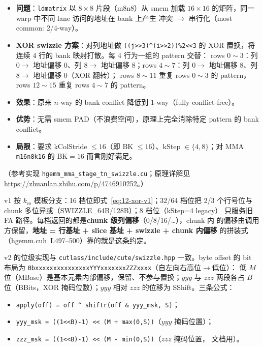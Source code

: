 \begin{itemize}
  \item \textbf{问题}：\texttt{ldmatrix} 以 $8\times8$ 片段（m8n8）从 smem 加载
        $16\times16$ 的矩阵，同一 warp 中不同 lane 访问的地址在 bank 上产生
        冲突 $\to$ 串行化（most common: 2/4-way）。
  \item \textbf{XOR swizzle 方案}：对列地址做 \texttt{((j>>3)\^{}(i>>2))\%2<<3} 的
        XOR 置换，将连续 4 行的 bank 映射打散。每 4 行为一组的 pattern 交替：
        rows $0{\sim}3$：列 $0\to$ 地址偏移 $0$、列 $8\to$ 地址偏移 $8$；rows
        $4{\sim}7$：列 $0\to$ 地址偏移 $8$、列 $8\to$ 地址偏移 $0$（XOR 翻转）；
        rows $8{\sim}11$ 重复 rows $0{\sim}3$ 的 pattern，rows $12{\sim}15$ 重复
        rows $4{\sim}7$ 的 pattern。
  \item \textbf{效果}：原来 $n$-way 的 bank conflict 降低到 1-way（fully
        conflict-free）。
  \item \textbf{优势}：无需 smem PAD（不浪费空间），原理上完全消除特定
        pattern 的 bank conflict。
  \item \textbf{局限}：要求 kColStride $\le 16$（即 BK $\le 16$）、kStep
        $\in \{4, 8\}$；对 MMA \texttt{m16n8k16} 的 BK$=16$ 而言刚好满足。
\end{itemize}

（参考实现 \texttt{hgemm\_mma\_stage\_tn\_swizzle.cu}；原理详解见
\url{https://zhuanlan.zhihu.com/p/4746910252}。）



v1 按 $k_{\mathrm{cs}}$ 模板分支：16 档位即式~\ref{eq:12-xor-v1}；32/64 档位把
2/3 个行号位与 chunk 多位异或（SWIZZLE\_64B/128B）；8 档位（kStep=4 legacy）
只服务旧 FA 路径。每档返回的都是\textbf{chunk 级列偏移}（0/8/16/…），chunk 内
的偏移由调用方保留，\textbf{地址 = 行基址 + slice 基址 + swizzle + chunk 内偏移}
的拼装式（hgemm.cuh~L497--500）靠的就是这条约定。

v2 的位级实现与 \texttt{cutlass/include/cute/swizzle.hpp} 一致。byte offset 的
bit 布局为 \texttt{0b\allowbreak{}xxxxxxxxxxxxxxx\allowbreak{}YYY\allowbreak{}xxxxxxx\allowbreak{}ZZZ\allowbreak{}xxxx}（自左向右高位$\to$低位）：
低 $M$ 位（MBase）是基本元素内部偏移，保留、不参与置换；$\mathit{yyy}$ 与
$\mathit{zzz}$ 两段各占 $B$ 位（BBits，XOR 掩码位数）；$\mathit{yyy}$ 相对 $\mathit{zzz}$
的位移为 SShift。三条公式：

\begin{itemize}
  \item \texttt{apply(off) = off \^{} shiftr(off \& yyy\_msk, S)}；
  \item \texttt{yyy\_msk = ((1<<B)-1) << (M + max(0,S))}\quad（$\mathit{yyy}$ 掩码位置）；
  \item \texttt{zzz\_msk = ((1<<B)-1) << (M - min(0,S))}\quad（$\mathit{zzz}$ 掩码位置，
        文档用）。
\end{itemize}

